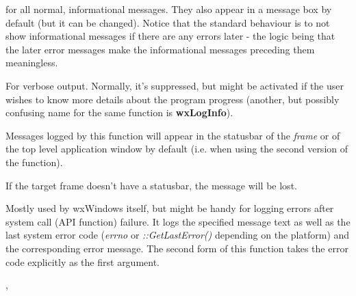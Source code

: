 
for all normal, informational messages. They also appear in a message box by
default (but it can be changed). Notice that the standard behaviour is to not
show informational messages if there are any errors later - the logic being
that the later error messages make the informational messages preceding them
meaningless.

\label{wxlogverbose}


For verbose output. Normally, it's suppressed, but
might be activated if the user wishes to know more details about the program
progress (another, but possibly confusing name for the same function is {\bf wxLogInfo}).

\label{wxlogstatus}



Messages logged by this function will appear in the statusbar of the {\it
frame} or of the top level application window by default (i.e. when using
the second version of the function).

If the target frame doesn't have a statusbar, the message will be lost.

\label{wxlogsyserror}


Mostly used by wxWindows itself, but might be handy for logging errors after
system call (API function) failure. It logs the specified message text as well
as the last system error code ({\it errno} or {\it ::GetLastError()} depending
on the platform) and the corresponding error message. The second form
of this function takes the error code explicitly as the first argument.


,

\label{wxlogdebug}


